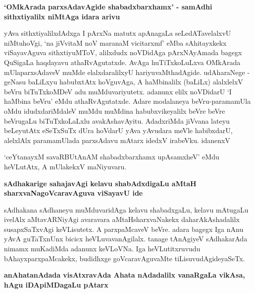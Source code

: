 {\bigskip
\noindent
{\large\bf `OMkArada parxsAdavAgide shabadxbarxhamx' - samAdhi sithxtiyalilx niMtAga idara arivu}}\label{page203}
\medskip

\noindent
yAva sithxtiyalilxdAdxga I pArxNa matutx apAnagaLa seLedATavelalxvU niMtuhoVgi, `na jiVvitaM noV\- maranaM vicitarxmf' eMba sAhitayxkekx viSayavAguva sithxtiyuMToV, alilxdudx noVDidAga pArxNA\-yAmada bagegx QuSigaLa haqdayavu athaRvAgutatxde. AvAga huTiTxkoLuLxva OMkArada mUlaparxsAdaveV muMde elalxdaralilxyU hariyuvaMthadAgide. udAharaNege - geNasu baLiLxyu habubxtAtx hoVgu\-vAga, A haMbinalilx (baLiLx) alalxlelxV beVru biTuTxkoMDeV adu muMduvariyutetx. adanunx elilx noVDi\-darU `I haMbina beVru' eMdu athaRvAgutatxde. Adare modalaneya beVru-paramamUla oMdu idudxda\-riMdaleV muMdu muMdina habubxvikeyalilx beVre beVre beVrugaLu biTuTxkoLaLxlu avakAshavAyitu. AdadxriMda jiVvana lateyu beLeyutAtx eSeTxSuTx dUra hoVdarU yAva yAvudara meVle habibxdarU, alelxlAlx paramamUlada parxsAdavu mAtarx idedxV irabeVku. idanenxV

`ceYtanayxM savaRBUtAnAM shabadxbarxhamx upAsamxheV' eMdu heVLutAtx, A mUlakekxV maNiyuvaru.\label{203}

{\bigskip
\noindent
{\large\bf sAdhakarige sahajavAgi kelavu shabAdxdigaLu aMtaH sharxvaNagoVcaravAguva viSayavU ide}}\label{page203}
\medskip

\noindent
sAdhakana sAdhaneyu muMduvaridAga kelavu shabadxgaLu, kelavu mAtugaLu ivelAlx aMtavARNi\-yAgi avaravara aMtaHsharxvaNakekx daharAkAshadalilx susapxSaTxvAgi keVLisutetx. A parxpaMcaveV beVre. adara bagegx Iga nAnu yAvA guTaTxnUnx bicicx heVLuvavanAgilalx. tanage tAnAgiyeV sAdhakarAda nimamx muKa\-diMda adanunx keVLoVNa. Iga heVLutitxruvudu bAhayxparxpaMcakekx, budidhxge goVcaravAguvaMte tiLisuvudAgide\-yaSeTx.

{\bigskip
\noindent
{\large\bf anAhatanAdada visAtxravAda Ahata nAdadalilx vanaRgaLa vikAsa, hAgu iDApiMDagaLu pAtarx}}\label{page211}
\medskip

